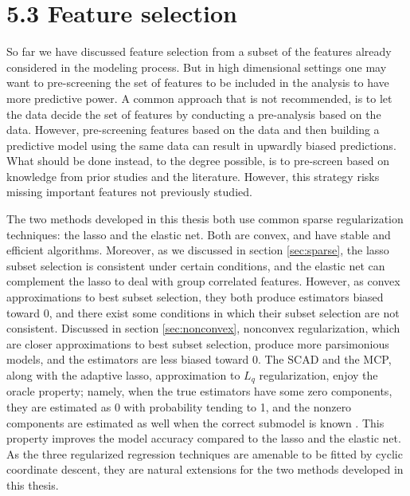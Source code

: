 \section*{5.3 \hspace{0.25cm} Feature selection}
So far we have discussed feature selection from a subset of the features already considered in the modeling process. But in high dimensional settings one may want to pre-screening the set of features to be included in the analysis to have more predictive power. A common approach that is not recommended, is to let the data decide the set of features by conducting a pre-analysis based on the data. However, pre-screening features based on the data and then building a predictive model using the same data can result in upwardly biased predictions. What should be done instead, to the degree possible, is to pre-screen based on knowledge from prior studies and the literature. However, this strategy risks missing important features not previously studied. 

The two methods developed in this thesis both use common sparse regularization techniques: the lasso and the elastic net. Both are convex, and have stable and efficient algorithms. Moreover, as we discussed in section \ref{sec:sparse}, the lasso subset selection is consistent under certain conditions, and the elastic net can complement the lasso to deal with group correlated features. However, as convex approximations to best subset selection, they both produce estimators biased toward 0, and there exist some conditions in which their subset selection are not consistent. Discussed in section \ref{sec:nonconvex}, nonconvex regularization, which are closer approximations to best subset selection, produce more parsimonious models, and the estimators are less biased toward 0. The SCAD and the MCP, along with the adaptive lasso, approximation to $L_q$ regularization, enjoy the oracle property; namely, when the true estimators have some zero components, they are estimated as 0 with probability tending to 1, and the nonzero components are estimated as well when the correct submodel is known \citep{fan2001variable}. This property improves the model accuracy compared to the lasso and the elastic net. As the three regularized regression techniques are amenable to be fitted by cyclic coordinate descent, they are natural extensions for the two methods developed in this thesis.

